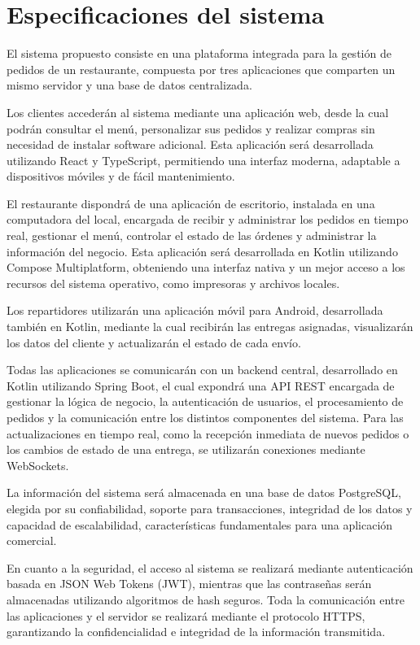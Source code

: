 \documentclass[12pt,a4paper]{report}
\begin{document}
\newpage

\section{Especificaciones del sistema}
\begin{justify}
El sistema propuesto consiste en una plataforma integrada para la gestión de pedidos de un restaurante, compuesta por tres aplicaciones que comparten un mismo servidor y una base de datos centralizada.

Los clientes accederán al sistema mediante una aplicación web, desde la cual podrán consultar el menú, personalizar sus pedidos y realizar compras sin necesidad de instalar software adicional. Esta aplicación será desarrollada utilizando React y TypeScript, permitiendo una interfaz moderna, adaptable a dispositivos móviles y de fácil mantenimiento.

El restaurante dispondrá de una aplicación de escritorio, instalada en una computadora del local, encargada de recibir y administrar los pedidos en tiempo real, gestionar el menú, controlar el estado de las órdenes y administrar la información del negocio. Esta aplicación será desarrollada en Kotlin utilizando Compose Multiplatform, obteniendo una interfaz nativa y un mejor acceso a los recursos del sistema operativo, como impresoras y archivos locales.

Los repartidores utilizarán una aplicación móvil para Android, desarrollada también en Kotlin, mediante la cual recibirán las entregas asignadas, visualizarán los datos del cliente y actualizarán el estado de cada envío. 

Todas las aplicaciones se comunicarán con un backend central, desarrollado en Kotlin utilizando Spring Boot, el cual expondrá una API REST encargada de gestionar la lógica de negocio, la autenticación de usuarios, el procesamiento de pedidos y la comunicación entre los distintos componentes del sistema. Para las actualizaciones en tiempo real, como la recepción inmediata de nuevos pedidos o los cambios
de estado de una entrega, se utilizarán conexiones mediante WebSockets.

La información del sistema será almacenada en una base de datos PostgreSQL, elegida por su confiabilidad, soporte para transacciones, integridad de los datos y capacidad de escalabilidad, características fundamentales para una aplicación comercial.

En cuanto a la seguridad, el acceso al sistema se realizará mediante autenticación basada en JSON Web Tokens (JWT), mientras que las contraseñas serán almacenadas utilizando algoritmos de hash seguros. Toda la comunicación entre las aplicaciones y el servidor se realizará mediante el protocolo HTTPS, garantizando la confidencialidad e integridad de la información transmitida.


\end{justify}
\end{document}
